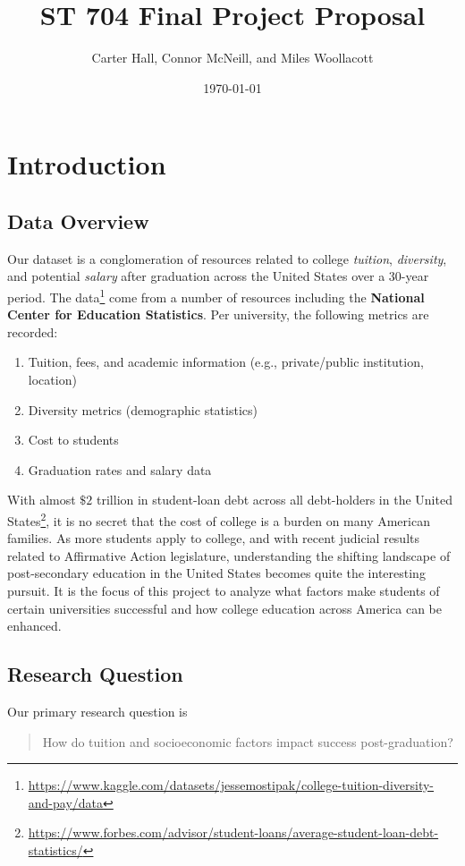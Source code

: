 \documentclass[11pt]{article}   	%
\title{{\bf{ST 704 Final Project Proposal}}}
\author{Carter Hall, Connor McNeill, and Miles Woollacott}
\date{\today}							%
\begin{document}
\maketitle

\section{Introduction}

\subsection*{Data Overview}

Our dataset is a conglomeration of resources related to college \textit{tuition}, \textit{diversity}, and potential \textit{salary} after graduation across the United States over a 30-year period. The data\footnote[1]{\url{https://www.kaggle.com/datasets/jessemostipak/college-tuition-diversity-and-pay/data}} come from a number of resources including the \textbf{National Center for Education Statistics}. Per university, the following metrics are recorded:
\begin{enumerate}
    \item Tuition, fees, and academic information (e.g., private/public institution, location)
    \item Diversity metrics (demographic statistics)
    \item Cost to students
    \item Graduation rates and salary data
\end{enumerate}
With almost $\$2$ trillion in student-loan debt across all debt-holders in the United States\footnote[2]{\url{https://www.forbes.com/advisor/student-loans/average-student-loan-debt-statistics/}}, it is no secret that the cost of college is a burden on many American families. As more students apply to college, and with recent judicial results related to Affirmative Action legislature, understanding the shifting landscape of post-secondary education in the United States becomes quite the interesting pursuit. It is the focus of this project to analyze what factors make students of certain universities successful and how college education across America can be enhanced.

\subsection*{Research Question}

Our primary research question is
\begin{quote}
    How do tuition and socioeconomic factors impact success post-graduation?
\end{quote}
\end{document}

